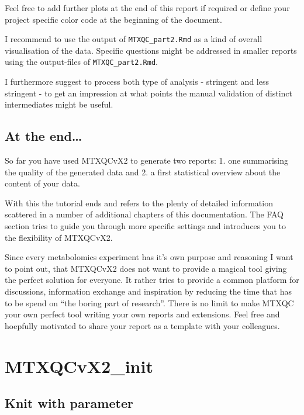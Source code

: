\documentclass[]{book}
\begin{document}
Feel free to add further plots at the end of this report if required or define your project specific color code at the beginning of the document.

I recommend to use the output of \texttt{MTXQC\_part2.Rmd} as a kind of overall visualisation of the data. Specific questions might be addressed in smaller reports using the output-files of \texttt{MTXQC\_part2.Rmd}.

I furthermore suggest to process both type of analysis - stringent and less stringent - to get an impression at what points the manual validation of distinct intermediates might be useful.

\hypertarget{at-the-end-1}{%
\section{At the end\ldots{}}\label{at-the-end-1}}

So far you have used MTXQCvX2 to generate two reports:
1. one summarising the quality of the generated data and
2. a first statistical overview about the content of your data.

With this the tutorial ends and refers to the plenty of detailed information scattered in a number of additional chapters of this documentation.
The FAQ section tries to guide you through more specific settings and introduces you to the flexibility of MTXQCvX2.

Since every metabolomics experiment has it's own purpose and reasoning I want to point out, that MTXQCvX2 does not want to provide a magical tool giving the perfect solution for everyone. It rather tries to provide a common platform for discussions, information exchange and inspiration by reducing the time that has to be spend on ``the boring part of research''. There is no limit to make MTXQC your own perfect tool writing your own reports and extensions. Feel free and hoepfully motivated to share your report as a template with your colleagues.

\hypertarget{init}{%
\chapter{MTXQCvX2\_init}\label{init}}

\hypertarget{knit-with-parameter}{%
\section{Knit with parameter}\label{knit-with-parameter}}
\end{document}

